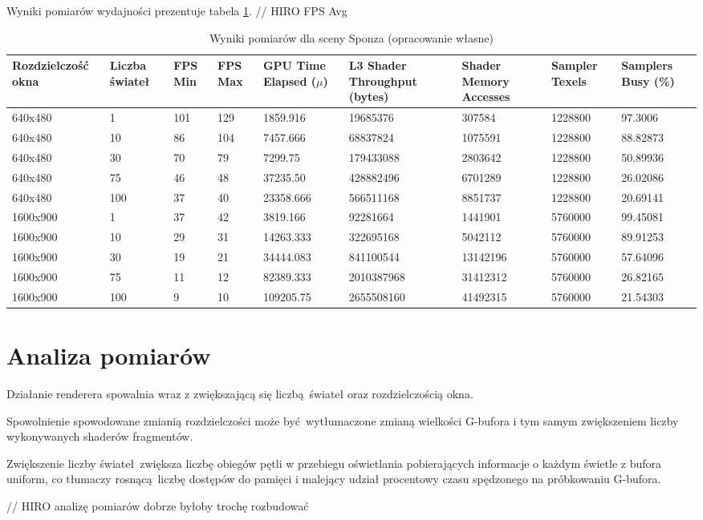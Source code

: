 Wyniki pomiarów wydajności prezentuje tabela \ref{results_sponza}.
// HIRO FPS Avg
\begin{table}[!ht]
	\centering
	\begin{tabular}{ |p{2cm}|p{1.1cm}||p{0.6cm}|p{0.6cm}||p{1.7cm}|p{1.8cm}|p{1.5cm}|p{1.3cm}|p{1.3cm}|}
		\hline
		Rozdzielczość okna & Liczba świateł & FPS Min & FPS Max & GPU Time Elapsed ($\mu$) & L3 Shader Throughput (bytes) & Shader Memory Accesses & Sampler Texels & Samplers Busy (\%) \\
		\hline \hline
		640x480 & 1 & 101 & 129 & 1859.916 & 19685376 & 307584 & 1228800 & 97.3006 \\
		\hline 
		640x480 & 10 & 86 & 104 & 7457.666 & 68837824 & 1075591 & 1228800 & 88.82873 \\
		\hline 
		640x480 & 30 & 70 & 79  & 7299.75 & 179433088 & 2803642 & 1228800 & 50.89936 \\
		\hline 
		640x480 & 75 & 46 & 48 & 37235.50 & 428882496 & 6701289 & 1228800 & 26.02086 \\
		\hline 
		640x480 & 100 & 37  & 40 & 23358.666 & 566511168 & 8851737 & 1228800 & 20.69141 \\
		\hline 	\hline 
		1600x900 & 1 & 37  & 42 & 3819.166 & 92281664 & 1441901 & 5760000 & 99.45081 \\
		\hline 
		1600x900 & 10 & 29  & 31 & 14263.333 & 322695168 & 5042112 & 5760000 & 89.91253 \\
		\hline 
		1600x900 & 30 & 19 & 21 & 34444.083 & 841100544 & 13142196 & 5760000 & 57.64096 \\
		\hline 
		1600x900 & 75 & 11 & 12 & 82389.333 & 2010387968 & 31412312 & 5760000 & 26.82165 \\
		\hline 
		1600x900 & 100 & 9  & 10 & 109205.75 & 2655508160 & 41492315 & 5760000 & 21.54303 \\
		\hline
	\end{tabular}
	\caption{Wyniki pomiarów dla sceny Sponza (opracowanie własne)} 
	\label{results_sponza}
\end{table}


\section{Analiza pomiarów}

Działanie renderera spowalnia wraz z zwiększającą się liczbą świateł oraz rozdzielczością okna.

Spowolnienie spowodowane zmianią rozdzielczości może być wytłumaczone zmianą wielkości G-bufora i tym samym zwiększeniem liczby wykonywanych shaderów fragmentów.

Zwiększenie liczby świateł zwiększa liczbę obiegów pętli w przebiegu oświetlania pobierających informacje o każdym świetle z bufora uniform, co tłumaczy rosnącą liczbę dostępów do pamięci i malejący udział procentowy czasu spędzonego na próbkowaniu G-bufora.

// HIRO analizę pomiarów dobrze byłoby trochę rozbudować
